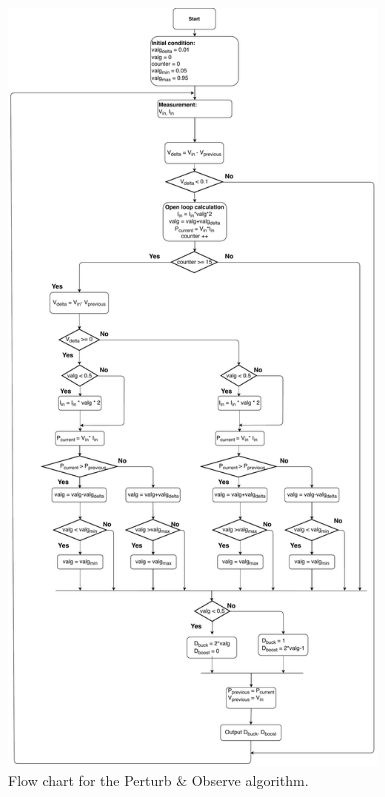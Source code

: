 \begin{figure}[H]
	\begin{center}
		\includegraphics[width=0.87\textwidth]{../Pictures/P1/Flow_chart/2018_11_29_Flow_chart_MPPT_Buck_Bosst_converter.pdf}
		\caption{Flow chart for the Perturb \& Observe algorithm.}
		\label{fcfinal} 
	\end{center}	
\end{figure}

